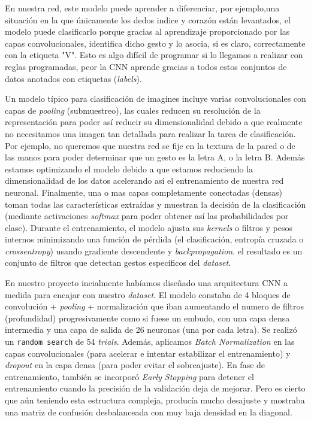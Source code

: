 
En nuestra red, este modelo puede aprender a diferenciar, por ejemplo,una situación en la que únicamente los dedos indice y corazón están levantados, el modelo puede clasificarlo porque gracias al aprendizaje proporcionado por las capas convolucionales, identifica dicho gesto y lo asocia, si es claro, correctamente con la etiqueta "V". Esto es algo difícil de programar si lo llegamos a realizar con reglas programadas, peor la CNN aprende gracias a todos estos conjuntos de datos anotados con etiquetas (\textit{labels}).

Un modelo típico para clasificación de imagines incluye varias convolucionales con capas de \textit{pooling} (submuestreo), las cuales reducen su resolución de la representación para poder así reducir su dimensionalidad debido a que realmente no necesitamos una imagen tan detallada para realizar la tarea de clasificación. Por ejemplo, no queremos que nuestra red se fije en la textura de la pared o de las manos para poder determinar que un gesto es la letra A, o la letra B. Además estamos optimizando el modelo debido a que estamos reduciendo la dimensionalidad de los datos acelerando así el entrenamiento de nuestra red neuronal. Finalmente, una o mas capas completamente conectadas (densas) toman todas las características extraídas y muestran la decisión de la clasificación (mediante activaciones \textit{softmax} para poder obtener así las probabilidades por clase). Durante el entrenamiento, el modelo ajusta sus \textit{kernels} o filtros y pesos internos minimizando una función de pérdida (el clasificación, entropía cruzada o \textit{crossentropy}) usando gradiente descendente y \textit{backpropagation}. el resultado es un conjunto de filtros que detectan gestos específicos del \textit{dataset}.

En nuestro proyecto incialmente habíamos diseñado una arquitectura CNN a medida para encajar con nuestro \textit{dataset}. El modelo constaba de 4 bloques de convolución + \textit{pooling} + normalización que iban aumentando el numero de filtros (profundidad) progresivamente como si fuese un embudo, con una capa densa intermedia y una capa de salida de 26 neuronas (una por cada letra). Se realizó un \texttt{random search} de 54 \textit{trials}. Además, aplicamos \textit{Batch Normalization} en las capas convolucionales (para acelerar e intentar estabilizar el entrenamiento) y \textit{dropout} en la capa densa (para poder evitar el sobreajuste). En fase de entrenamiento, también se incorporó \textit{Early Stopping} para detener el entrenamiento cuando la precisión de la validación deja de mejorar. Pero es cierto que aún teniendo esta estructura compleja, producía mucho desajuste y mostraba una matriz de confusión desbalanceada con muy baja densidad en la diagonal.

